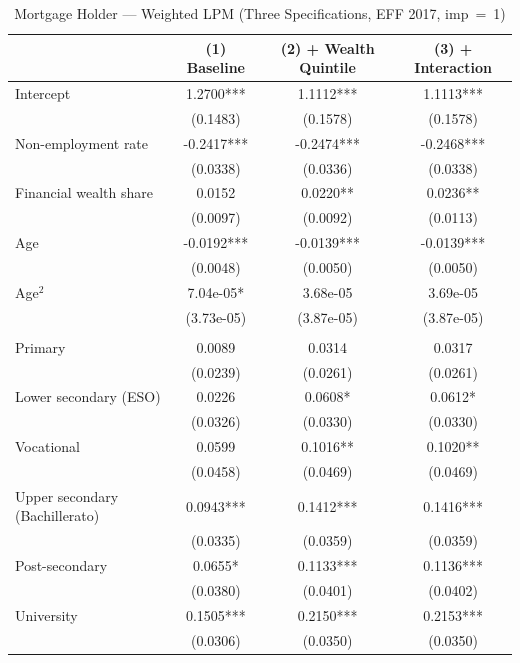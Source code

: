 \begin{table}[!h]

\caption{Mortgage Holder --- Weighted LPM (Three Specifications, EFF 2017, imp~=~1)}
\centering
\begin{tabular}[t]{lccc}
\toprule
  & (1) Baseline & (2) + Wealth Quintile & (3) + Interaction\\
\midrule
Intercept & 1.2700*** & 1.1112*** & 1.1113***\\
 & (0.1483) & (0.1578) & (0.1578)\\
Non-employment rate & -0.2417*** & -0.2474*** & -0.2468***\\
 & (0.0338) & (0.0336) & (0.0338)\\
Financial wealth share & 0.0152 & 0.0220** & 0.0236**\\
 & (0.0097) & (0.0092) & (0.0113)\\
Age & -0.0192*** & -0.0139*** & -0.0139***\\
 & (0.0048) & (0.0050) & (0.0050)\\
Age$^2$ & 7.04e-05* & 3.68e-05 & 3.69e-05\\
 & (3.73e-05) & (3.87e-05) & (3.87e-05)\\
\addlinespace[0.3em]
\multicolumn{4}{l}{\textit{Education (ref.: Illiterate)}}\\
\hspace{6pt} Primary & 0.0089 & 0.0314 & 0.0317\\
 & (0.0239) & (0.0261) & (0.0261)\\
\hspace{6pt} Lower secondary (ESO) & 0.0226 & 0.0608* & 0.0612*\\
 & (0.0326) & (0.0330) & (0.0330)\\
\hspace{6pt} Vocational & 0.0599 & 0.1016** & 0.1020**\\
 & (0.0458) & (0.0469) & (0.0469)\\
\hspace{6pt} Upper secondary (Bachillerato) & 0.0943*** & 0.1412*** & 0.1416***\\
 & (0.0335) & (0.0359) & (0.0359)\\
\hspace{6pt} Post-secondary & 0.0655* & 0.1133*** & 0.1136***\\
 & (0.0380) & (0.0401) & (0.0402)\\
\hspace{6pt} University & 0.1505*** & 0.2150*** & 0.2153***\\
 & (0.0306) & (0.0350) & (0.0350)\\

\end{tabular}
\end{table}
